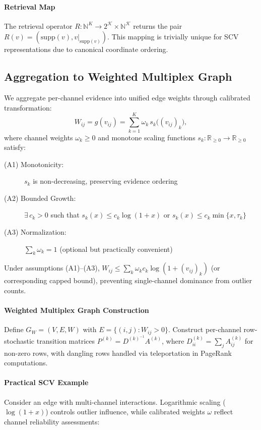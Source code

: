 \documentclass[12pt]{article}
\theoremstyle{plain}
\begin{document}
\paragraph{Retrieval Map}
The retrieval operator $R:\mathbb{N}^K\to 2^{\mathcal{K}}\times\mathbb{N}^{\mathcal{K}}$ returns the pair $R(v)=(\mathrm{supp}(v), v|_{\mathrm{supp}(v)})$. This mapping is trivially unique for SCV representations due to canonical coordinate ordering.

\subsection{Aggregation to Weighted Multiplex Graph}
We aggregate per-channel evidence into unified edge weights through calibrated transformation:
\begin{equation}
\label{eq:agg}
W_{ij}=g(v_{ij})=\sum_{k=1}^{K}\omega_k\, s_k\!\big((v_{ij})_k\big),
\end{equation}
where channel weights $\omega_k\ge 0$ and monotone scaling functions $s_k:\mathbb{R}_{\ge0}\to\mathbb{R}_{\ge0}$ satisfy:

\begin{description}
\item[(A1) Monotonicity:] $s_k$ is non-decreasing, preserving evidence ordering
\item[(A2) Bounded Growth:] $\exists\,c_k>0$ such that $s_k(x)\le c_k\log(1+x)$ or $s_k(x)\le c_k\min\{x,\tau_k\}$
\item[(A3) Normalization:] $\sum_k \omega_k=1$ (optional but practically convenient)
\end{description}

Under assumptions (A1)–(A3), $W_{ij}\le \sum_k \omega_k c_k\log(1+(v_{ij})_k)$ (or corresponding capped bound), preventing single-channel dominance from outlier counts.

\paragraph{Weighted Multiplex Graph Construction}
Define $G_W=(V,E,W)$ with $E=\{(i,j):W_{ij}>0\}$. Construct per-channel row-stochastic transition matrices $P^{(k)}=D^{(k)^{-1}}A^{(k)}$, where $D^{(k)}_{ii}=\sum_j A^{(k)}_{ij}$ for non-zero rows, with dangling rows handled via teleportation in PageRank computations.

\paragraph{Practical SCV Example}
Consider an edge with multi-channel interactions. Logarithmic scaling ($\log(1+x)$) controls outlier influence, while calibrated weights $\omega$ reflect channel reliability assessments:
\end{document}
